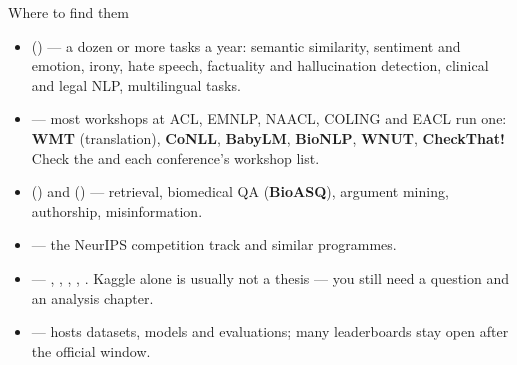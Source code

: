\documentclass[aspectratio=169,11pt]{beamer}
\begin{document}
\begin{frame}{Where to find them}
\footnotesize
\begin{itemize}
  \item {} () ---
        a dozen or more tasks a year: semantic similarity, sentiment and
        emotion, irony, hate speech, factuality and hallucination detection,
        clinical and legal NLP, multilingual tasks.
  \item {} --- most workshops at ACL,
        EMNLP, NAACL, COLING and EACL run one: \textbf{WMT} (translation),
        \textbf{CoNLL}, \textbf{BabyLM}, \textbf{BioNLP}, \textbf{WNUT},
        \textbf{CheckThat!} Check the
         and each conference's
        workshop list.
  \item {} ()
        and  () ---
        retrieval, biomedical QA (\textbf{BioASQ}), argument mining,
        authorship, misinformation.
  \item {} --- the NeurIPS competition
        track and similar programmes.
  \item {} --- ,
        ,
        ,
        ,
        . Kaggle alone is usually
        not a thesis --- you still need a question and an analysis chapter.
  \item {} --- 
        hosts datasets, models and evaluations; many leaderboards stay open
        after the official window.
\end{itemize}
\end{frame}
\end{document}
